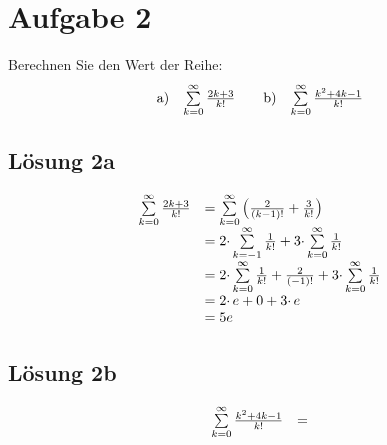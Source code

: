 \section{Aufgabe 2}

Berechnen Sie den Wert der Reihe:
\begin{align*}
	\begin{array}{ l c }
		\text{a)} & \sum\limits _{k=0}^{\infty }\frac{2k+3}{k!}
	\end{array} & & \begin{array}{ l c }
		\text{b)} & \sum\limits _{k=0}^{\infty }\frac{k^{2} +4k-1}{k!}
	\end{array}
\end{align*}


\subsection{Lösung 2a}
\begin{equation*}
	\begin{array}{ c l }
		\sum\limits _{k=0}^{\infty }\frac{2k+3}{k!} & =\sum\limits _{k=0}^{\infty }\left(\frac{2}{( k-1) !} +\frac{3}{k!}\right)\\
		& =2\cdotp \sum\limits _{k=-1}^{\infty }\frac{1}{k!} +3\cdotp \sum\limits _{k=0}^{\infty }\frac{1}{k!}\\
		& =2\cdotp \sum\limits _{k=0}^{\infty }\frac{1}{k!} +\frac{2}{( -1) !} +3\cdotp \sum\limits _{k=0}^{\infty }\frac{1}{k!}\\
		& =2\cdotp e+0+3\cdotp e\\
		& =5e
	\end{array}
\end{equation*}

\subsection{Lösung 2b}
\begin{equation*}
	\begin{array}{ c l }
		\sum\limits _{k=0}^{\infty }\frac{k^{2} +4k-1}{k!} & =\\
		& 
	\end{array}
\end{equation*}
